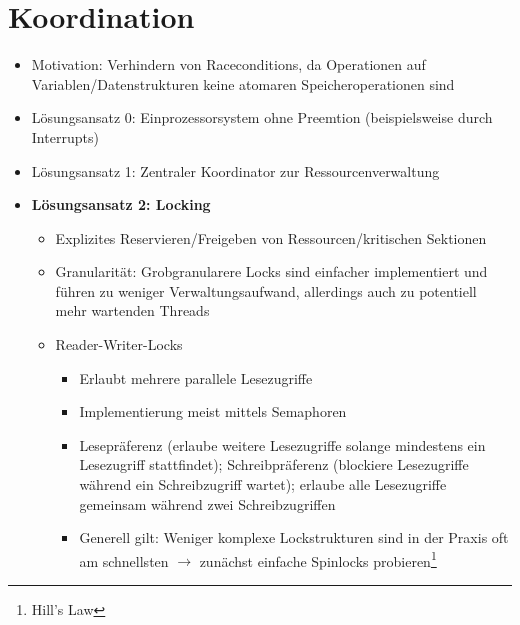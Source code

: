 \section{Koordination}
\begin{itemize}
	\item Motivation: Verhindern von Raceconditions, da Operationen auf Variablen/Datenstrukturen keine atomaren Speicheroperationen sind
	\item Lösungsansatz 0: Einprozessorsystem ohne Preemtion (beispielsweise durch Interrupts)
	\item Lösungsansatz 1: Zentraler Koordinator zur Ressourcenverwaltung
	\item \textbf{Lösungsansatz 2: Locking}
	\begin{itemize}
		\item Explizites Reservieren/Freigeben von Ressourcen/kritischen Sektionen
		\item Granularität: Grobgranularere Locks sind einfacher implementiert und führen zu weniger Verwaltungsaufwand, allerdings auch zu potentiell mehr wartenden Threads
		\item Reader-Writer-Locks
		\begin{itemize}
			\item Erlaubt mehrere parallele Lesezugriffe
			\item Implementierung meist mittels Semaphoren
			\item Lesepräferenz (erlaube weitere Lesezugriffe solange mindestens ein Lesezugriff stattfindet); Schreibpräferenz (blockiere Lesezugriffe während ein Schreibzugriff wartet); erlaube alle Lesezugriffe gemeinsam während zwei Schreibzugriffen
			\item Generell gilt: Weniger komplexe Lockstrukturen sind in der Praxis oft am schnellsten \(\rightarrow\) zunächst einfache Spinlocks probieren\footnote{Hill's Law}
		\end{itemize}
	\end{itemize}
\end{itemize}


